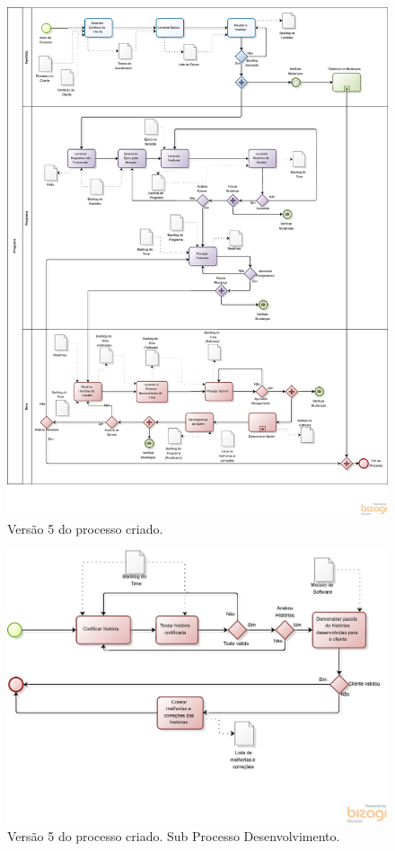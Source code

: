 \begin{apendicesenv}
\begin{figure}[H]
    \centering
	\includegraphics[keepaspectratio=true,scale=0.52]{figuras/evolucao_processo/Processo_v5_1.eps}
    \caption{Versão 5 do processo criado.}
    \label{fig:processo}
\end{figure}

\begin{figure}[H]
    \centering
	\includegraphics[keepaspectratio=true,scale=0.53]{figuras/evolucao_processo/Processo_v5_2.eps}
    \caption{Versão 5 do processo criado. Sub Processo Desenvolvimento. }
    \label{fig:processo}
\end{figure}


\end{apendicesenv}

